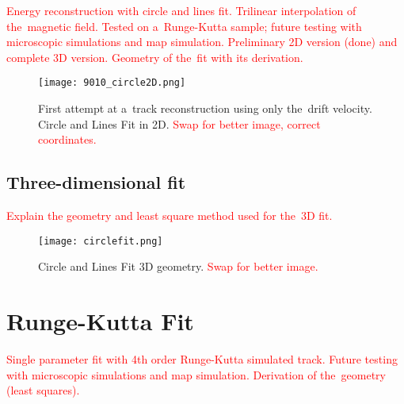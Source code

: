 			\textcolor{red}{Energy reconstruction with circle and lines fit. Trilinear interpolation of the~magnetic field. Tested on a~Runge-Kutta sample; future testing with microscopic simulations and map simulation. Preliminary 2D version (done) and complete 3D version. Geometry of the~fit with its derivation.}
			
			\begin{figure}
				\centering
				\texttt{[image: 9010\_circle2D.png]}
				\caption{First attempt at a~track reconstruction using only the~drift velocity. Circle and Lines Fit in 2D. \textcolor{red}{Swap for better image, correct coordinates.}}
				\label{fig:9010circle2D}
			\end{figure}
		
		\subsection{Three-dimensional fit}
			\textcolor{red}{Explain the geometry and least square method used for the~3D fit.}
			
			\begin{figure}
				\centering
				\texttt{[image: circlefit.png]}
				\caption{Circle and Lines Fit 3D geometry. \textcolor{red}{Swap for better image.}}
				\label{fig:circlefit}
			\end{figure}
	
	\section{Runge-Kutta Fit}
		\textcolor{red}{Single parameter fit with 4th order Runge-Kutta simulated track. Future testing with microscopic simulations and map simulation. Derivation of the~geometry (least squares).}